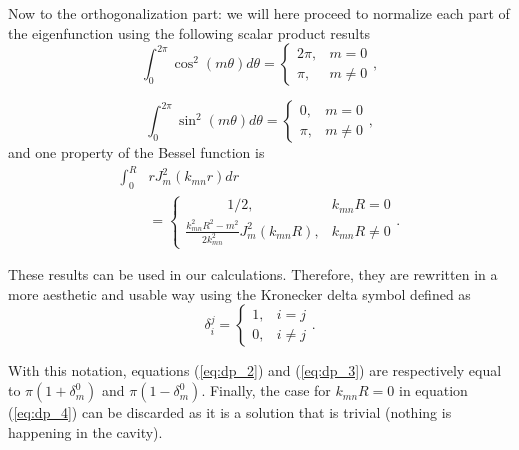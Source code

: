\documentclass[%
 reprint,
 amsmath,amssymb,
 aps,
]{revtex4-2}
\begin{document}
Now to the orthogonalization part: we will here proceed to normalize each part of the eigenfunction using the following scalar product results 
\begin{equation}
   \int_0^{2 \pi} \cos^2\left( m \theta \right) d\theta = 
    \begin{cases}    
        2 \pi, & m = 0\\
        \pi, & m \ne 0
    \end{cases}, \label{eq:dp_2}
\end{equation}

\begin{equation}
    \int_0^{2 \pi} \sin^2\left( m \theta \right) d\theta = 
    \begin{cases}    
        0, & m = 0\\
        \pi, & m \ne 0
    \end{cases}, \label{eq:dp_3}
\end{equation}
and one property of the Bessel function is\cite{abramsteg}
\begin{equation}
    \begin{split}
        \int_0^{R} &r J^2_m (k_{mn} r)dr \\ &=
    \begin{cases}    
        \quad  \quad \quad 1/2, & k_{mn}R = 0\\
        \frac{k^2_{mn} R^2 - m^2}{2 k^2_{mn}} J^2_m (k_{mn} R), & k_{mn}R \ne 0
    \end{cases}.
    \end{split} \label{eq:dp_4}
\end{equation}

These results can be used in our calculations. Therefore, they are rewritten in a more aesthetic and usable way using the Kronecker delta symbol defined as 
\begin{equation}
   \delta_i^j = \begin{cases}
       1, & i = j\\ 0, & i \ne j
   \end{cases}.
\end{equation}

With this notation, equations (\ref{eq:dp_2}) and (\ref{eq:dp_3}) are respectively equal to $\pi(1 + \delta_m^0)$ and $\pi(1 - \delta_m^0)$. Finally, the case for $k_{mn}R = 0$ in equation (\ref{eq:dp_4}) can be discarded as it is a solution that is trivial (nothing is happening in the cavity).
\end{document}
